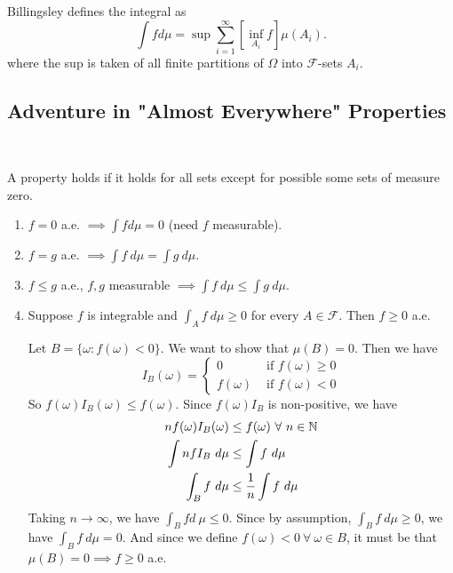 \documentclass[class=article,crop=false]{standalone}
\begin{document}
\begin{remark}
Billingsley defines the integral as 
\[
	\int f d \mu = \sup \sum_{ i= 1}^{\infty} \left[ \inf_{A_i} f  \right]  \mu (A_i)
.\] 
where the sup is taken of all finite partitions of $ \Omega$ into $ \mathcal{F}$-sets $ A_i$.
\end{remark}

\subsection*{Adventure in "Almost Everywhere" Properties}

~\begin{defn}
A property holds  if it holds for all sets except for possible some sets of measure zero. 
\end{defn}

\begin{enumerate}[label=\arabic*)]
	\item $ f=0$ a.e.  $ \implies \int f d \mu = 0$ (need $ f$ measurable).
	\item  $ f=g$ a.e.  $ \implies \int f \ d \mu = \int g \ d \mu$.
	\item $ f\leq g$ a.e.,  $ f,g$ measurable  $ \implies \int f \ d \mu \leq \int g\ d \mu$.
	\item Suppose $ f$ is integrable and  $ \int_{  A}  f \ d  \mu \geq 0$ for every $ A \in \mathcal{F}$. Then $ f \geq 0$ a.e.
		 \begin{prf}
			 Let $ B = \{\omega: f(\omega) < 0\} $. We want to show that $ \mu(B)=0$. Then we have
			 \begin{equation*}
				 I_{B}(\omega) = 
			 \begin{cases}
				 0 & \text{ if } f(\omega)\geq 0\\
				 f(\omega) & \text{ if } f(\omega)<0 
			 \end{cases}
			 \end{equation*}
			 So $ f(\omega) I_{B}(\omega) \leq f(\omega)$. Since $ f(\omega) I_B $ is non-positive, we have
			 \begin{align*}
				 nf(\omega) I_{B}(\omega) &\leq f(\omega) \ \forall \ n \in \mathbb{N} \\
				 \int n f I_B\ d \mu &\leq \int f\ d\mu\\
				 \int_B f\ d\mu &\leq \frac{1}{n} \int f\ d\mu  
			 \end{align*}
			 Taking $ n \to \infty$, we have $ \int_B f d \ \mu \leq 0$.
			 Since by assumption, $ \int_B f \ d \mu \geq 0$, we have $ \int_B f\ d \mu = 0$. And since we define $ f(\omega)<0 \ \forall \ \omega \in B$, it must be that $ \mu(B) = 0 \implies f\geq 0$ a.e.
		\end{prf}
\end{enumerate}
\end{document}
